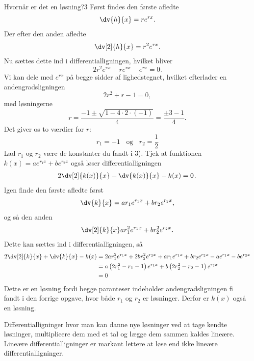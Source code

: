 \begin{opgave}{Hvornår er det en løsning?}{3}
	Først findes den første afledte
$$
\dv{h}{x}=re^{rx}.
$$
Der efter den anden afledte
$$
\dv[2]{h}{x}=r^2e^{rx}.
$$
Nu sættes dette ind i differentialligningen, hvilket bliver
$$
2r^2e^{rx}+re^{rx}-e^{rx}=0.
$$
Vi kan dele med $e^{rx}$ på begge sidder af lighedstegnet, hvilket efterlader en andengradsligningen
$$
2r^2+r-1=0,
$$
med løsningerne
$$
r=\frac{-1\pm\sqrt{1-4\cdot 2\cdot (-1)}}{4}=\frac{\pm 3-1}{4}.
$$
Det giver os to værdier for $r$:
$$r_1=-1~~~~\text{og}~~~~r_2=\frac{1}{2}$$
	\opg Lad $r_1$ og $r_2$ være de konstanter du fandt i 3). Tjek at funktionen $k (x) = ae^{r_1x} + be^{r_2x} $ også løser differentialligningen
	\begin{align*}
	2 \dv[2]{k(x)}{x} + \dv{k(x)}{x} - k(x) = 0 \, .
	\end{align*}
Igen finde den første afledte først
$$
\dv{k}{x}=ar_1e^{r_1x}+br_2e^{r_2x},
$$
og så den anden
$$
\dv[2]{k}{x}ar_1^2e^{r_1x}+br_2^2e^{r_2x}.
$$
Dette kan sættes ind i differentialligningen, så
\begin{align*}
2\dv[2]{k}{x}+\dv{k}{x}-k(x)&=2ar_1^2e^{r_1x}+2br_2^2e^{r_2x}+ar_1e^{r_1x}+br_2e^{r_2x}-ae^{r_1x}-be^{r_2x}\\
&=a\left(2r_1^2-r_1-1\right)e^{r_1x}+b\left(2r_2^2-r_2-1\right)e^{r_2x}\\
&=0
\end{align*}
Dette er en løsning fordi begge paranteser indeholder andengradsligningen fi fandt i den forrige opgave, hvor både $r_1$ og $r_2$ er løsninger. Derfor er $k(x)$ også en løsning.

Differentialligninger hvor man kan danne nye løsninger ved at tage kendte løsninger, multiplicere dem med et tal og lægge dem sammen kaldes lineære. Lineære differentialligninger er markant lettere at løse end ikke lineære differentialligninger.
\end{opgave}

